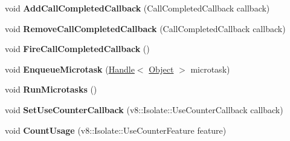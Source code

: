 \begin{DoxyCompactItemize}
\item 
\hypertarget{classv8_1_1internal_1_1_isolate_ab1e71528cbb0b79d44eb2dbc0a03c38b}{}void {\bfseries Add\+Call\+Completed\+Callback} (Call\+Completed\+Callback callback)\label{classv8_1_1internal_1_1_isolate_ab1e71528cbb0b79d44eb2dbc0a03c38b}

\item 
\hypertarget{classv8_1_1internal_1_1_isolate_a556b9cd41f26acd9577405a459d794c0}{}void {\bfseries Remove\+Call\+Completed\+Callback} (Call\+Completed\+Callback callback)\label{classv8_1_1internal_1_1_isolate_a556b9cd41f26acd9577405a459d794c0}

\item 
\hypertarget{classv8_1_1internal_1_1_isolate_a967a40b2fbb51dc3a14529f7a501c9bc}{}void {\bfseries Fire\+Call\+Completed\+Callback} ()\label{classv8_1_1internal_1_1_isolate_a967a40b2fbb51dc3a14529f7a501c9bc}

\item 
\hypertarget{classv8_1_1internal_1_1_isolate_a355acef471c0f83c18eae394a7cbca77}{}void {\bfseries Enqueue\+Microtask} (\hyperlink{classv8_1_1internal_1_1_handle}{Handle}$<$ \hyperlink{classv8_1_1internal_1_1_object}{Object} $>$ microtask)\label{classv8_1_1internal_1_1_isolate_a355acef471c0f83c18eae394a7cbca77}

\item 
\hypertarget{classv8_1_1internal_1_1_isolate_a955f88ef2775d35d39f8fe1c4f441d54}{}void {\bfseries Run\+Microtasks} ()\label{classv8_1_1internal_1_1_isolate_a955f88ef2775d35d39f8fe1c4f441d54}

\item 
\hypertarget{classv8_1_1internal_1_1_isolate_a774d9acf270e7e3145c40bb081413135}{}void {\bfseries Set\+Use\+Counter\+Callback} (v8\+::\+Isolate\+::\+Use\+Counter\+Callback callback)\label{classv8_1_1internal_1_1_isolate_a774d9acf270e7e3145c40bb081413135}

\item 
\hypertarget{classv8_1_1internal_1_1_isolate_a2fbd063d0fbd9a69e5e5adebceefddf1}{}void {\bfseries Count\+Usage} (v8\+::\+Isolate\+::\+Use\+Counter\+Feature feature)\label{classv8_1_1internal_1_1_isolate_a2fbd063d0fbd9a69e5e5adebceefddf1}

\end{DoxyCompactItemize}
